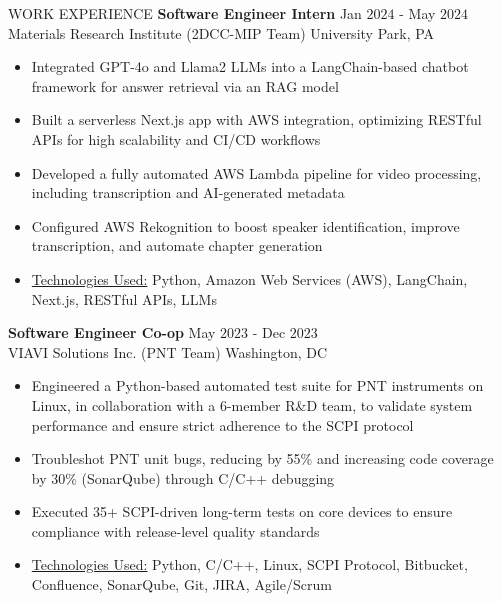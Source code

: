 \documentclass{resume} %
\begin{document}
\begin{rSection}{WORK EXPERIENCE}
{\bf Software Engineer Intern} \hfill Jan $2024$ - May $2024$\\
Materials Research Institute (2DCC-MIP Team) \hfill University Park, PA
\begin{itemize}[itemsep = -4pt]
    \item Integrated GPT-4o and Llama2 LLMs into a LangChain-based chatbot framework for answer retrieval via an RAG model 
    \item Built a serverless Next.js app with AWS integration, optimizing RESTful APIs for high scalability and CI/CD workflows
    \item Developed a fully automated AWS Lambda pipeline for video processing, including transcription and AI-generated metadata
    \item Configured AWS Rekognition to boost speaker identification, improve transcription, and automate chapter generation
    \item \underline{Technologies Used:} Python, Amazon Web Services (AWS), LangChain, Next.js, RESTful APIs, LLMs
\end{itemize}

{\bf Software Engineer Co-op} \hfill May $2023$ - Dec $2023$\\
VIAVI Solutions Inc. (PNT Team) \hfill Washington, DC
\begin{itemize}[itemsep = -4pt]
    \item Engineered a Python-based automated test suite for PNT instruments on Linux, in collaboration with a 6-member R\&D team, to validate system performance and ensure strict adherence to the SCPI protocol
    \item Troubleshot PNT unit bugs, reducing by 55\% and increasing code coverage by 30\% (SonarQube) through C/C++ debugging
    \item Executed 35+ SCPI-driven long-term tests on core devices to ensure compliance with release-level quality standards
    \item \underline{Technologies Used:} Python, C/C++, Linux, SCPI Protocol, Bitbucket, Confluence, SonarQube, Git, JIRA, Agile/Scrum
\end{itemize}


\end{rSection}
\end{document}
